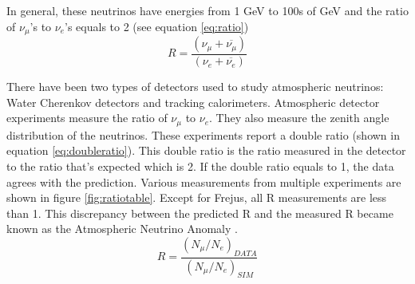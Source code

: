 In general, these neutrinos have energies from 1 GeV to 100s of GeV and the ratio of $\nu_{\mu}$'s to $\nu_{e}$'s equals to 2 (see equation \ref{eq:ratio})
\begin{equation}
\label{eq:ratio}
R = \frac{(\nu_{\mu} + \overline{\nu_{\mu}})}{(\nu_{e} + \overline{\nu_{e}})}
\end{equation} 


There have been two types of detectors used to study atmospheric neutrinos: Water Cherenkov detectors and tracking calorimeters. Atmospheric detector experiments measure the ratio of $\nu_{\mu}$ to $\nu_{e}$. They also measure the zenith angle distribution of the neutrinos. These experiments report a double ratio (shown in equation \ref{eq:doubleratio}). This double ratio is the ratio measured in the detector to the ratio that's expected which is 2. If the double ratio equals to 1, the data agrees with the prediction. Various measurements from multiple experiments are shown in figure \ref{fig:ratiotable}. Except for Frejus, all R measurements are less than 1. This discrepancy between the predicted R and the measured R became known as the Atmospheric Neutrino Anomaly \cite{superk}.
\begin{equation}
\label{eq:doubleratio}
R = \frac{(N_{\mu}/N_{e})_{DATA}}{(N_{\mu}/N_{e})_{SIM}}
\end{equation}

\begin{table}[htp!]
\centering
\caption{Measurements of the double ratio for various atmospheric neutrino experiments}
\label{fig:ratiotable}
\end{table}

